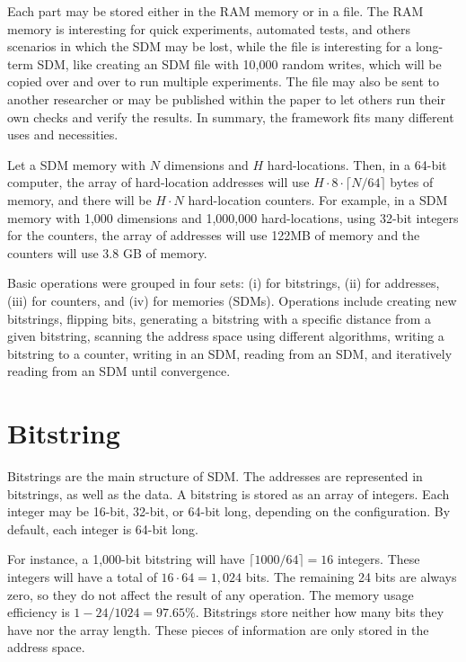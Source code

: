 Each part may be stored either in the RAM memory or in a file. The RAM memory is interesting for quick experiments, automated tests, and others scenarios in which the SDM may be lost, while the file is interesting for a long-term SDM, like creating an SDM file with 10,000 random writes, which will be copied over and over to run multiple experiments. The file may also be sent to another researcher or may be published within the paper to let others run their own checks and verify the results. In summary, the framework fits many different uses and necessities.

Let a SDM memory with $N$ dimensions and $H$ hard-locations. Then, in a 64-bit computer, the array of hard-location addresses will use $H \cdot 8 \cdot \lceil N/64 \rceil$ bytes of memory, and there will be $H \cdot N$ hard-location counters. For example, in a SDM memory with 1,000 dimensions and 1,000,000 hard-locations, using 32-bit integers for the counters, the array of addresses will use 122MB of memory and the counters will use 3.8 GB of memory.

Basic operations were grouped in four sets: (i) for bitstrings, (ii) for addresses, (iii) for counters, and (iv) for memories (SDMs). Operations include creating new bitstrings, flipping bits, generating a bitstring with a specific distance from a given bitstring, scanning the address space using different algorithms, writing a bitstring to a counter, writing in an SDM, reading from an SDM, and iteratively reading from an SDM until convergence.


\section{Bitstring}

Bitstrings are the main structure of SDM. The addresses are represented in bitstrings, as well as the data. A bitstring is stored as an array of integers. Each integer may be 16-bit, 32-bit, or 64-bit long, depending on the configuration. By default, each integer is 64-bit long.

For instance, a 1,000-bit bitstring will have $\lceil 1000/64 \rceil = 16$ integers. These integers will have a total of $16 \cdot 64 = 1,024$ bits. The remaining 24 bits are always zero, so they do not affect the result of any operation. The memory usage efficiency is $1 - 24/1024 = 97.65\%$. Bitstrings store neither how many bits they have nor the array length. These pieces of information are only stored in the address space.


